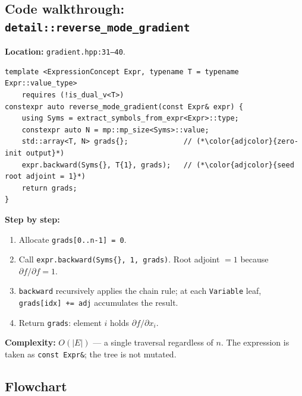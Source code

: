 \documentclass[11pt,a4paper]{article}
\newcommand{\code}[1]{\texttt{#1}}
\begin{document}
\subsection{Code walkthrough: \texttt{detail::reverse\_mode\_gradient}}
\label{sec:revcode}

\textbf{Location:} \texttt{gradient.hpp:31--40}.

\begin{lstlisting}
template <ExpressionConcept Expr, typename T = typename Expr::value_type>
    requires (!is_dual_v<T>)
constexpr auto reverse_mode_gradient(const Expr& expr) {
    using Syms = extract_symbols_from_expr<Expr>::type;
    constexpr auto N = mp::mp_size<Syms>::value;
    std::array<T, N> grads{};             // (*\color{adjcolor}{zero-init output}*)
    expr.backward(Syms{}, T{1}, grads);   // (*\color{adjcolor}{seed root adjoint = 1}*)
    return grads;
}
\end{lstlisting}

\medskip\noindent\textbf{Step by step:}
\begin{enumerate}
  \item Allocate \code{grads[0..n-1] = 0}.
  \item Call \code{expr.backward(Syms\{\}, 1, grads)}.  Root adjoint $= 1$
        because $\partial f/\partial f = 1$.
  \item \code{backward} recursively applies the chain rule; at each
        \code{Variable} leaf, \code{grads[idx] += adj} accumulates the result.
  \item Return \code{grads}: element $i$ holds $\partial f/\partial x_i$.
\end{enumerate}

\textbf{Complexity:} $O(|E|)$ --- a single traversal regardless of $n$.
The expression is taken as \code{const Expr\&}; the tree is not mutated.

\subsection{Flowchart}
\end{document}
